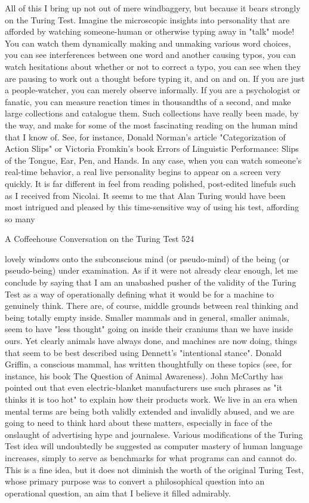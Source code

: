    All of this I bring up not out of mere windbaggery, but because it bears strongly on
the Turing Test. Imagine the microscopic insights into personality that are afforded by
watching someone-human or otherwise typing away in "talk" mode! You can watch
them dynamically making and unmaking various word choices, you can see
interferences between one word and another causing typos, you can watch hesitations
about whether or not to correct a typo, you can see when they are pausing to work out
a thought before typing it, and on and on. If you are just a people-watcher, you can
merely observe informally. If you are a psychologist or fanatic, you can measure
reaction times in thousandths of a second, and make large collections and catalogue
them. Such collections have really been made, by the way, and make for some of the
most fascinating reading on the human mind that I know of. See, for instance, Donald
Norman's article "Categorization of Action Slips" or Victoria Fromkin's book Errors
of Linguistic Performance: Slips of the Tongue, Ear, Pen, and Hands.
   In any case, when you can watch someone's real-time behavior, a real live
personality begins to appear on a screen very quickly. It is far different in feel from
reading polished, post-edited linefuls such as I received from Nicolai. It seems to me
that Alan Turing would have been most intrigued and pleased by this time-sensitive
way of using his test, affording so many




A Coffeehouse Conversation on the Turing Test                                         524

lovely windows onto the subconscious mind (or pseudo-mind) of the being (or
pseudo-being) under examination.
    As if it were not already clear enough, let me conclude by saying that I am an
unabashed pusher of the validity of the Turing Test as a way of operationally defining
what it would be for a machine to genuinely think. There are, of course, middle
grounds between real thinking and being totally empty inside. Smaller mammals and
in general, smaller animals, seem to have "less thought" going on inside their
craniums than we have inside ours. Yet clearly animals have always done, and
machines are now doing, things that seem to be best described using Dennett's
"intentional stance". Donald Griffin, a conscious mammal, has written thoughtfully on
these topics (see, for instance, his book The Question of Animal Awareness). John
McCarthy has pointed out that even electric-blanket manufacturers use such phrases
as "it thinks it is too hot" to explain how their products work. We live in an era when
mental terms are being both validly extended and invalidly abused, and we are going
to need to think hard about these matters, especially in face of the onslaught of
advertising hype and journalese. Various modifications of the Turing Test idea will
undoubtedly be suggested as computer mastery of human language increases, simply
to serve as benchmarks for what programs can and cannot do. This is a fine idea, but
it does not diminish the worth of the original Turing Test, whose primary purpose was
to convert a philosophical question into an operational question, an aim that I believe
it filled admirably.




